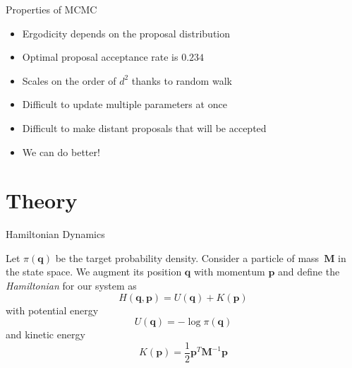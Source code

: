 \documentclass{beamer}
\renewcommand{\vec}[1]{\ensuremath{\mathbf{#1}}}
\newcommand{\mat}[1]{\ensuremath{\mathbf{#1}}}
\begin{document}
    \begin{frame}{Properties of MCMC}

        \begin{itemize}
            \item Ergodicity depends on the proposal distribution
            \item Optimal proposal acceptance rate is $0.234$
            \item Scales on the order of $d^2$ thanks to random walk
            \item Difficult to update multiple parameters at once
            \item Difficult to make distant proposals that will be accepted
            \item We can do better!
        \end{itemize}

    \end{frame}

    \section{Theory}

    \begin{frame}{Hamiltonian Dynamics}
        \begin{definition}
            Let $\pi\left(\vec{q}\right)$ be the target probability density.
            Consider a particle of mass~$\mat{M}$ in the state space.
            We augment its position $\vec{q}$ with momentum $\vec{p}$ and define
            the \emph{Hamiltonian} for our system as
            \begin{equation*}
                H\left(\vec{q},\vec{p}\right) = U\left(\vec{q}\right) + K\left(\vec{p}\right)
            \end{equation*}
            with potential energy
            \begin{equation*}
                U\left(\vec{q}\right) = - \log{\pi\left(\vec{q}\right)}
            \end{equation*}
            and kinetic energy
            \begin{equation*}
                K\left(\vec{p}\right) = \frac{1}{2} \vec{p}^T \mat{M}^{-1} \vec{p}
            \end{equation*}
        \end{definition}

    \end{frame}
\end{document}
